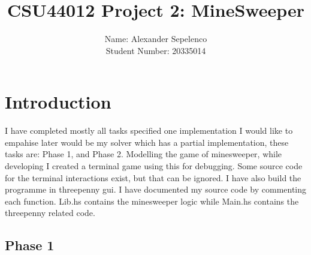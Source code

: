 \documentclass{article} %
\title{CSU44012 Project 2: MineSweeper}
\author{Name: Alexander Sepelenco\\Student Number: 20335014}
\date{} %
\begin{document}
\maketitle
\tableofcontents

\section{Introduction}
I have completed mostly all tasks specified one implementation I would like to empahise later would be my solver which has a partial implementation, 
these tasks are: Phase 1, and Phase 2. Modelling the game of minesweeper, 
while developing I created a terminal game using this for debugging. Some source code for the terminal interactions exist,
but that can be ignored. I have also build the programme in threepenny gui. I have documented my source code by commenting
each function. Lib.hs contains the minesweeper logic while Main.hs contains the threepenny related code.

\subsection{Phase 1}
\end{document}
